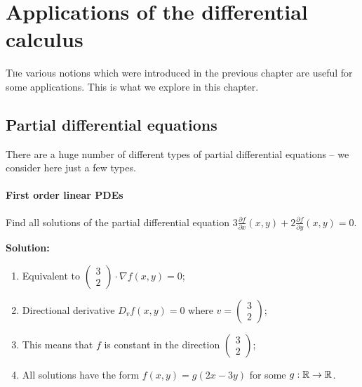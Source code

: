 \chapter{Applications of the differential calculus}

\lettrine{T}{h}e various notions which were introduced in the previous chapter are useful for some applications.
This is what we explore in this chapter.

\section{Partial differential equations}

There are a huge number of different types of partial differential equations -- we consider here just a few types.

\subsubsection*{First order linear PDEs}


\begin{example}
    Find all solutions of the partial differential equation
    \(3 \frac{\partial f}{\partial x}(x,y) + 2 \frac{\partial f}{\partial y} (x,y) = 0\).
\end{example}

\textbf{Solution:}

\begin{enumerate}
    \item Equivalent to
          \(\left( \begin{smallmatrix}
              3 \\ 2
          \end{smallmatrix} \right)
          \cdot
          \nabla f(x,y) =0\);
    \item Directional derivative \( D_{v}f(x,y) = 0\) where \(v=\left( \begin{smallmatrix}
                  3 \\ 2
              \end{smallmatrix} \right)\);
    \item This means that \(f\) is constant in the direction \(\left( \begin{smallmatrix}
              3 \\ 2
          \end{smallmatrix} \right)\);
    \item All solutions have the form \(f(x,y) = g(2x-3y)\) for some \(g:\mathbb{R} \to \mathbb{R}\).
\end{enumerate}

